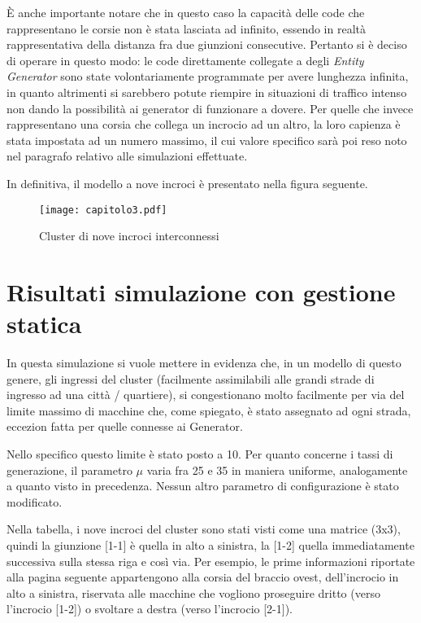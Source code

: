 È anche importante notare che in questo caso la capacità delle code che rappresentano le corsie non è stata lasciata ad infinito, essendo in realtà rappresentativa della distanza fra due giunzioni consecutive. Pertanto si è deciso di operare in questo modo: le code direttamente collegate a degli \textit{Entity Generator} sono state volontariamente programmate per avere lunghezza infinita, in quanto altrimenti si sarebbero potute riempire in situazioni di traffico intenso non dando la possibilità ai generator di funzionare a dovere. Per quelle che invece rappresentano una corsia che collega un incrocio ad un altro, la loro capienza è stata impostata ad un numero massimo, il cui valore specifico sarà poi reso noto nel paragrafo relativo alle simulazioni effettuate.

In definitiva, il modello a nove incroci è presentato nella figura seguente.
\newpage

\begin{figure}[H]
  \texttt{[image: capitolo3.pdf]}
  \caption{Cluster di nove incroci interconnessi}
  \label{fig:}
\end{figure}
\newpage

\section{Risultati simulazione con gestione statica}

In questa simulazione si vuole mettere in evidenza che, in un modello di questo genere, gli ingressi del cluster (facilmente assimilabili alle grandi strade di ingresso ad una città / quartiere), si congestionano molto facilmente per via del limite massimo di macchine che, come spiegato, è stato assegnato ad ogni strada, eccezion fatta per quelle connesse ai Generator. 

Nello specifico questo limite è stato posto a 10. Per quanto concerne i tassi di generazione, il parametro $\mu$ varia fra 25 e 35 in maniera uniforme, analogamente a quanto visto in precedenza. Nessun altro parametro di configurazione è stato modificato.

Nella tabella, i nove incroci del cluster sono stati visti come una matrice (3x3), quindi la giunzione [1-1] è quella in alto a sinistra, la [1-2] quella immediatamente successiva sulla stessa riga e così via. Per esempio, le prime informazioni riportate alla pagina seguente appartengono alla corsia del braccio ovest, dell'incrocio in alto a sinistra, riservata alle macchine che vogliono proseguire dritto (verso l'incrocio [1-2]) o svoltare a destra (verso l'incrocio [2-1]).


